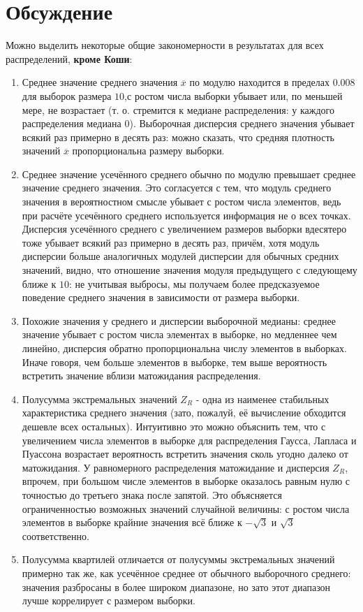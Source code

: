 \documentclass[report1.tex]{subfiles}
\begin{document}
\section{Обсуждение}
Можно выделить некоторые общие закономерности в результатах для всех распределений, \textbf{кроме Коши}:
\begin{enumerate}
	\item Среднее значение среднего значения $\overline{x}$ по модулю находится в пределах $0.008$ для выборок размера $10$,с ростом числа выборки убывает или, по меньшей мере, не возрастает (т. о. стремится к медиане распределения: у каждого распределения медиана $0$). Выборочная дисперсия среднего значения убывает всякий раз примерно в десять раз: можно сказать, что средняя плотность значений $\overline{x}$ пропорциональна размеру выборки.
	\item Среднее значение усечённого среднего обычно по модулю превышает среднее значение среднего значения. Это согласуется с тем, что модуль среднего значения в вероятностном смысле убывает с ростом числа элементов, ведь при расчёте усечённого среднего используется информация не о всех точках. Дисперсия усечённого среднего с увеличением размеров выборки вдесятеро тоже убывает всякий раз примерно в десять раз, причём, хотя модуль дисперсии больше аналогичных модулей дисперсии для обычных средних значений, видно, что отношение значения модуля предыдущего с следующему ближе к $10$: не учитывая выбросы, мы получаем более предсказуемое поведение среднего значения в зависимости от размера выборки. 
	\item Похожие значения у среднего и дисперсии выборочной медианы: среднее значение убывает с ростом числа элементах в выборке, но медленнее чем линейно, дисперсия обратно пропорциональна числу элементов в выборках. Иначе говоря, чем больше элементов в выборке, тем выше вероятность встретить значение вблизи матожидания распределения.
	\item Полусумма экстремальных значений $Z_R$ - одна из наименее стабильных характеристика среднего значения (зато, пожалуй, её вычисление обходится дешевле всех остальных). Интуитивно это можно объяснить тем, что с увеличением числа элементов в выборке для распределения Гаусса, Лапласа и Пуассона возрастает вероятность встретить значения сколь угодно далеко от матожидания.  У равномерного распределения матожидание и дисперсия $Z_R$, впрочем, при большом числе элементов в выборке оказалось равным нулю с точностью до третьего знака после запятой. Это объясняется ограниченностью возможных значений случайной величины: с ростом числа элементов в выборке крайние значения всё ближе к $-\sqrt{3}$ и $\sqrt{3}$ соответственно.
	\item Полусумма квартилей отличается от полусуммы экстремальных значений примерно так же, как усечённое среднее от обычного выборочного среднего: значения разбросаны в более широком диапазоне, но зато этот диапазон лучше коррелирует с размером выборки.
\end{enumerate}
\end{document}
